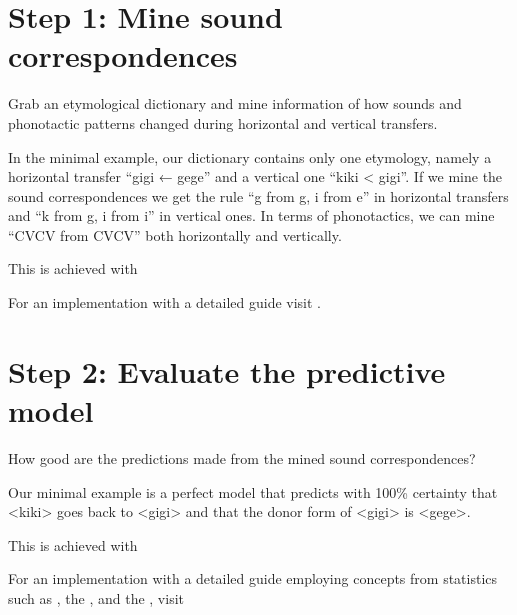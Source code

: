 \documentclass[letterpaper,10pt,english]{sphinxmanual}
\begin{document}
\section{Step 1: Mine sound correspondences}
\label{\detokenize{tutorial:step-1-mine-sound-correspondences}}
\sphinxAtStartPar
Grab an etymological dictionary and mine information of how sounds
and phonotactic patterns changed during horizontal and vertical transfers.

\sphinxAtStartPar
In the minimal example, our dictionary contains only one etymology, namely
a horizontal transfer “gigi ← gege” and a vertical one “kiki \textless{} gigi”.
If we mine the sound correspondences we get the rule “g from g, i from e”
in horizontal transfers and “k from g, i from i” in vertical ones.
In terms of phonotactics, we can mine “CVCV from CVCV” both horizontally
and vertically.

\sphinxAtStartPar
This is achieved with 

\sphinxAtStartPar
For an implementation with a detailed guide visit .


\section{Step 2: Evaluate the predictive model}
\label{\detokenize{tutorial:step-2-evaluate-the-predictive-model}}
\sphinxAtStartPar
How good are the predictions made from the mined sound correspondences?

\sphinxAtStartPar
Our minimal example is a perfect model that predicts with 100\% certainty that
\textless{}kiki\textgreater{} goes back to \textless{}gigi\textgreater{} and that the donor form of \textless{}gigi\textgreater{} is \textless{}gege\textgreater{}.

\sphinxAtStartPar
This is achieved with 

\sphinxAtStartPar
For an implementation with a detailed guide
employing concepts from statistics such as ,
the ,
and the ,
visit 
\end{document}
